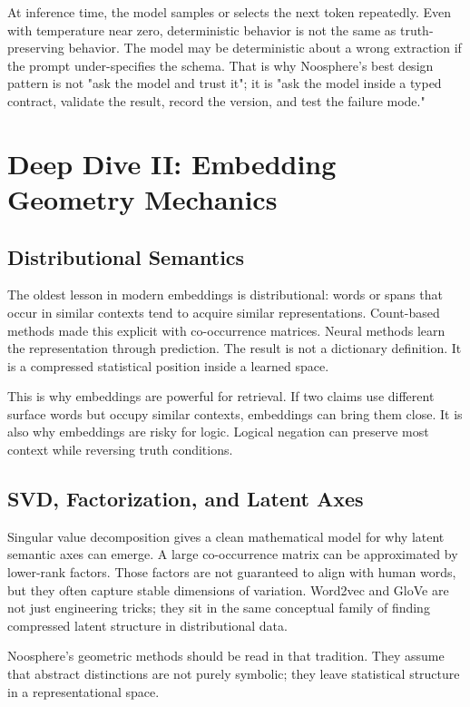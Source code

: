 \documentclass[11pt]{article}
\begin{document}
At inference time, the model samples or selects the next token repeatedly. Even
with temperature near zero, deterministic behavior is not the same as
truth-preserving behavior. The model may be deterministic about a wrong
extraction if the prompt under-specifies the schema. That is why Noosphere's
best design pattern is not "ask the model and trust it"; it is "ask the model
inside a typed contract, validate the result, record the version, and test the
failure mode."

\section{Deep Dive II: Embedding Geometry Mechanics}

\subsection{Distributional Semantics}

The oldest lesson in modern embeddings is distributional: words or spans that
occur in similar contexts tend to acquire similar representations. Count-based
methods made this explicit with co-occurrence matrices. Neural methods learn
the representation through prediction. The result is not a dictionary
definition. It is a compressed statistical position inside a learned space.

This is why embeddings are powerful for retrieval. If two claims use different
surface words but occupy similar contexts, embeddings can bring them close. It
is also why embeddings are risky for logic. Logical negation can preserve most
context while reversing truth conditions.

\subsection{SVD, Factorization, and Latent Axes}

Singular value decomposition gives a clean mathematical model for why latent
semantic axes can emerge. A large co-occurrence matrix can be approximated by
lower-rank factors. Those factors are not guaranteed to align with human words,
but they often capture stable dimensions of variation. Word2vec and GloVe are
not just engineering tricks; they sit in the same conceptual family of finding
compressed latent structure in distributional data.

Noosphere's geometric methods should be read in that tradition. They assume
that abstract distinctions are not purely symbolic; they leave statistical
structure in a representational space.
\end{document}
